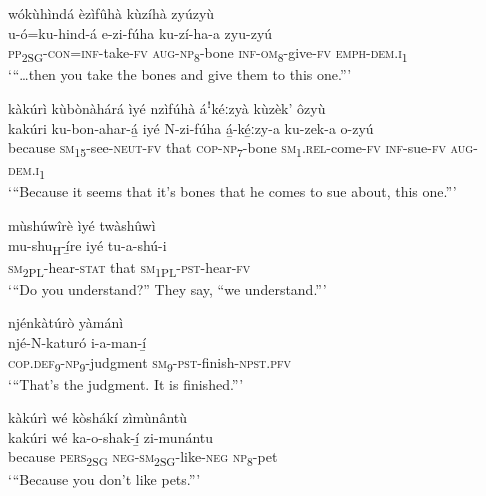 wókùhìndá èzìfûhà kùzíhà zyúzyù\\
\gll u-ó=ku-hind-á    e-zi-fúha    ku-zí-ha-a    zyu-zyú\\
\textsc{pp}\textsubscript{2SG}{}-\textsc{con}=\textsc{inf}{}-take-\textsc{fv}  \textsc{aug}{}-\textsc{np}\textsubscript{8}{}-bone  \textsc{inf}{}-\textsc{om}\textsubscript{8}{}-give-\textsc{fv}  \textsc{emph}{}-\textsc{dem}.\textsc{i}\textsubscript{1}\\
\glt ‘“…then you take the bones and give them to this one.”’\bigskip

kàkúrì kùbònàhárá ìyé nzìfúhà áꜝkéːzyà kùzèk’ ôzyù\\
\gll kakúri    ku-bon-ahar-á̲  iyé N-zi-fúha    á̲-ké̲ːzy-a    ku-zek-a  o-zyú \\
because  \textsc{sm}\textsubscript{15}{}-see-\textsc{neut}{}-\textsc{fv}  that
\textsc{cop}{}-\textsc{np}\textsubscript{7}{}-bone  \textsc{sm}\textsubscript{1}.\textsc{rel}{}-come-\textsc{fv}  \textsc{inf}{}-sue-\textsc{fv}  \textsc{aug}{}-\textsc{dem}.\textsc{i}\textsubscript{1}\\
\glt ‘“Because it seems that it’s bones that he comes to sue about, this one.”’\bigskip

mùshúwîrè ìyé twàshûwì\\
\gll mu-shu\textsubscript{H}{}-í̲re    iyé  tu-a-shú-i\\
\textsc{sm}\textsubscript{2PL}{}-hear-\textsc{stat}  that  \textsc{sm}\textsubscript{1PL}{}-\textsc{pst}{}-hear-\textsc{fv}\\
\glt ‘“Do you understand?” They say, “we understand.”’\bigskip

\newpage
njénkàtúrò yàmánì\\
\gll njé-N-katuró    i-a-man-í̲\\
\textsc{cop}.\textsc{def}\textsubscript{9}{}-\textsc{np}\textsubscript{9}{}-judgment  \textsc{sm}\textsubscript{9}{}-\textsc{pst}{}-finish-\textsc{npst}.\textsc{pfv}\\
\glt ‘“That’s the judgment. It is finished.”’\bigskip

kàkúrì wé kòshákí zìmùnântù\\
\gll kakúri    wé    ka-o-shak-í̲      zi-munántu\\
because  \textsc{pers}\textsubscript{2SG}  \textsc{neg}{}-\textsc{sm}\textsubscript{2SG}{}-like-\textsc{neg}  \textsc{np}\textsubscript{8}{}-pet\\
\glt ‘“Because you don’t like pets.”’\bigskip

